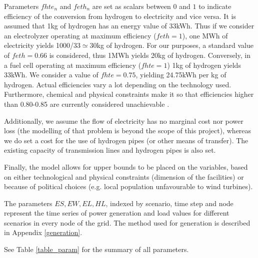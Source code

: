 \documentclass[smallextended,natbib]{svjour3}       %
\numberwithin{theorem}{section}
\begin{document}
Parameters $fhte_n$ and $feth_n$ are set as scalars between $0$ and $1$ to indicate efficiency of the conversion from hydrogen to electricity and vice versa. 
It is assumed that 1kg of hydrogen has an energy value of 33kWh. %
Thus if we consider an electrolyzer operating at maximum efficiency ($feth=1$), one MWh of electricity yields 1000/33$\simeq$30kg of hydrogen. 
For our purposes, a standard value of $feth=0.66$ is considered, thus 1MWh yields 20kg of hydrogen. 
Conversely, in a fuel cell operating at maximum efficiency ($fhte=1$) 1kg of hydrogen yields 33kWh. 
We consider a value of $fhte=0.75$, yielding 24.75kWh per kg of hydrogen. Actual efficiencies vary a lot depending on the technology used. 
Furthermore, chemical and physical constraints make it so that efficiencies higher than 0.80-0.85 are currently considered unachievable \citep{DAWOOD}.

Additionally, we assume the flow of electricity has no marginal cost nor power loss (the modelling of that problem is beyond the scope of this project), whereas we do set a cost for the use of hydrogen pipes (or other means of transfer). 
The existing capacity of transmission lines and hydrogen pipes is also set.

Finally, the model allows for upper bounds to be placed on the variables, based on either technological and physical constraints (dimension of the facilities) or because of political choices (e.g. local population unfavourable to wind turbines).

The parameters $ES, EW, EL, HL$, indexed by scenario, time step and node represent the time series of power generation and load values for different scenarios in every node of the grid. 
The method used for generation is described in Appendix \ref{generation}.

See Table \ref{table_param} for the summary of all parameters. 
\end{document}
